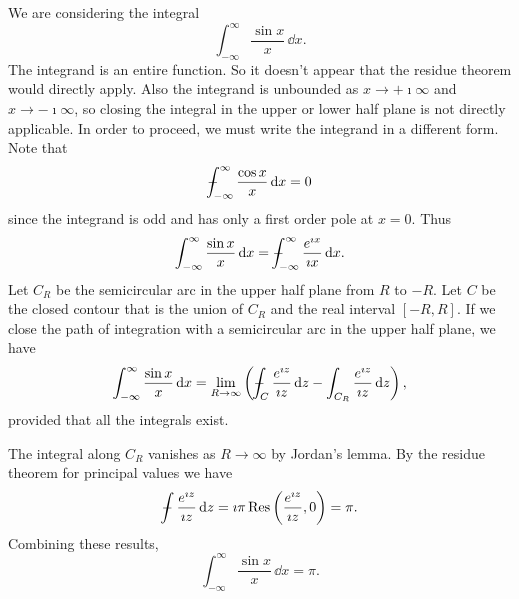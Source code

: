 {%
\begin{Solution}
  \label{solution sin(x)/x}
  We are considering the integral
  \[
  \int_{-\infty}^\infty \frac{\sin x}{x} \,\dd x.
  \]
  The integrand is an entire function.  So it doesn't appear that the residue
  theorem would directly apply. Also the integrand is unbounded as 
  $x \to + \imath \infty$ and $x \to - \imath \infty$, so closing the integral in the
  upper or lower half plane is not directly applicable.  In order to proceed,
  we must write the integrand in a different form.
  Note that
  \[
  - \negthickspace \negthickspace \negthickspace \negmedspace \int_{-\infty}^\infty \frac{\cos x}{x} \,\mathrm{d} x = 0
  \]
  since the integrand is odd and has only a first order pole at $x = 0$.
  Thus
  \[
  \int_{-\infty}^\infty \frac{\sin x}{x} \,\mathrm{d} x
  = - \negthickspace \negthickspace \negthickspace \negmedspace \int_{-\infty}^\infty \frac{e^{\imath x}}{\imath x} \,\mathrm{d} x.
  \]
  Let $C_R$ be the semicircular arc in the upper half plane from $R$ to $-R$.
  Let $C$ be the closed contour that is the union of $C_R$ and the real interval
  $[-R,R]$.
  If we close the path of integration with a semicircular arc in the upper
  half plane, we have
  \[
  \int_{-\infty}^\infty \frac{\sin x}{x} \,\mathrm{d} x
  = \lim_{R \to \infty} \left( - \negthickspace \negthickspace \negthickspace \negmedspace \int_C \frac{e^{\imath z}}{\imath z} \,\mathrm{d} z
    - \int_{C_R} \frac{e^{\imath z}}{\imath z} \,\mathrm{d} z \right),
  \]
  provided that all the integrals exist.

  The integral along $C_R$ vanishes as $R \to \infty$ by Jordan's lemma.
  By the residue theorem for principal values we have
  \[
  - \negthickspace \negthickspace \negthickspace \negmedspace \int \frac{e^{\imath z}}{\imath z} \,\mathrm{d} z = \imath \pi \mathop{\mathrm{Res}}\nolimits\left( \frac{e^{\imath z}}{\imath z}, 0
  \right) = \pi.
  \]
  Combining these results,
  \[
  \boxed{
    \int_{-\infty}^\infty \frac{\sin x}{x} \,\dd x = \pi.
    }
  \]
\end{Solution}



}
